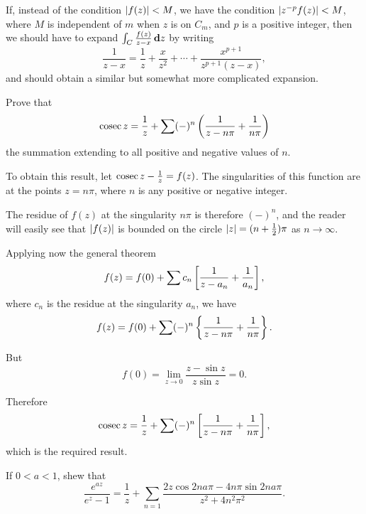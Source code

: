 If, instead of the condition $\left| f(z) \right| < M$, we have the
condition $\left|  z^{-p} f(z)  \right| < M$,
where $M$ is independent of $m$ when $z$ is on $C_{m}$, and $p$ is
a positive integer, then we should have to
expand $\int_{C} \frac{f(z)}{z-x} \, \mathbf{d} z$ by writing
$$
\frac{1}{z-x}
=
\frac{1}{z}
+ \frac{x}{z^{2}}
+ \cdots
+ \frac{x^{p+1}}{z^{p+1}(z-x)},
$$
and should obtain a similar but somewhat more complicated expansion.
\begin{wandwexample}
Prove that
$$
\operatorname{cosec} z
=
\frac{1}{z}
+
\sum (-)^{n}
\left( \frac{1}{z-n\pi} + \frac{1}{n\pi} \right)
$$
the summation extending to all positive and negative values of $n$.

To obtain this result, let $\operatorname{cosec} z - \frac{1}{z} = f(z)$.
The singularities of this function are at the
points $z=n\pi$, where $n$ is any positive or negative integer.

The residue of $f(z)$ at the singularity $n\pi$ is therefore
$(-)^{n}$, and the reader will easily see that $\left| f(z) \right|$ is
bounded on the circle $\left| z \right| = (n + \frac{1}{2}) \pi$ as
$n \rightarrow \infty$.

Applying now the general theorem
$$
f(z)
=
f(0)
+
\sum c_{n} \left[  \frac{1}{z-a_{n}} + \frac{1}{a_{n}}   \right],
$$
where $c_{n}$ is the residue at the singularity $a_{n}$, we have
$$
f(z)
=
f(0)
+
\sum (-)^{n} \left\{  \frac{1}{z-n\pi} + \frac{1}{n\pi}   \right\}.
$$

But
$$
f(0)
=
\lim_{z \rightarrow 0} \frac{z - \sin z}{z \sin z} = 0.
$$

Therefore
$$
\operatorname{cosec} z
=
\frac{1}{z}
+
\sum (-)^{n} \left[  \frac{1}{z-n\pi} + \frac{1}{n\pi}   \right],
$$
which is the required result.
\end{wandwexample}
\begin{wandwexample}
If $0<a<1$, shew that
$$
\frac{e^{az}}{e^{z}-1}
=
\frac{1}{z}
+
\sum_{n=1}
\frac{2z \cos 2na\pi - 4n\pi \sin 2na\pi}{z^{2}+4n^{2}\pi^{2}}.
$$
\end{wandwexample}
